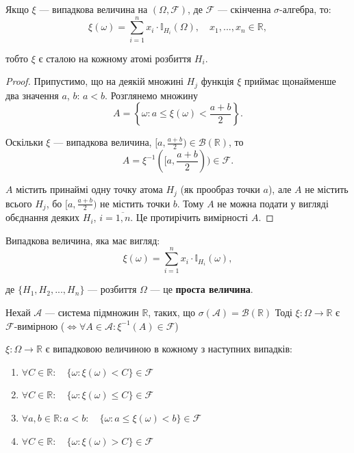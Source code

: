 \begin{theorem}
    Якщо $\xi$ --- випадкова величина на $(\Omega, \mathcal{F})$,
    де $\mathcal{F}$ --- скінченна $\sigma$-алгебра, то:
    $$\xi(\omega) = \sum\limits_{i=1}^{n} x_i \cdot \mathbb{I}_{H_i}(\Omega),
    \quad x_1, ..., x_n \in \mathbb{R},$$
    
    тобто $\xi$ є сталою на кожному атомі розбиття $H_i$.
\end{theorem}
\begin{proof}
    Припустимо, що на деякій множині $H_j$ функція $\xi$ приймає щонайменше два 
    значення $a$, $b$: $a < b$. 
    Розглянемо множину 
    $$A = \left\{\omega: a \leqslant \xi(\omega) < \frac{a+b}{2}\right\}.$$
    
    Оскільки $\xi$ --- випадкова величина, $[a, \frac{a+b}{2}) \in \mathcal{B}(\mathbb{R})$, то
    $$A = \xi^{-1}([a, \frac{a+b}{2})) \in \mathcal{F}.$$
    
    $A$ містить принаймі одну точку атома $H_j$ (як прообраз точки $a$), але $A$ не
    містить всього $H_j$, бо $[a, \frac{a+b}{2})$ не містить точки $b$.
    Тому $A$ не можна подати у вигляді обєднання деяких $H_i$, $i = \overline{1, n}$.
    Це протирічить вимірності $A$.
\end{proof}

\begin{definition}
    Випадкова величина, яка має вигляд:
    $$\xi(\omega) = \sum\limits_{i=1}^{n} x_i \cdot \mathbb{I}_{H_i}(\omega),$$

    де $\{H_1, H_2, ..., H_n\}$ --- розбиття $\Omega$ --- це \textbf{проста величина}.
\end{definition}

\begin{theorem}
    Нехай $\mathcal{A}$ --- система підмножин $\mathbb{R}$, таких, що
    $\sigma(\mathcal{A}) = \mathcal{B}(\mathbb{R})$
    Тоді $\xi: \Omega \rightarrow \mathbb{R}$ є $\mathcal{F}$-вимірною
    ($\Leftrightarrow \forall A \in \mathcal{A}: \xi^{-1}(A) \in \mathcal{F}$) 
\end{theorem}

\begin{corollary}
    $\xi: \Omega \rightarrow \mathbb{R}$ є випадковою величиною в
    кожному з наступних випадків:

    \begin{enumerate}
        \item $\forall C \in \mathbb{R}: \quad \{\omega: \xi(\omega) < C\} \in \mathcal{F}$
        \item $\forall C \in \mathbb{R}: \quad \{\omega: \xi(\omega) \leqslant C\} \in \mathcal{F}$
        \item $\forall a, b \in \mathbb{R}: a < b: \quad \{\omega: a \leqslant \xi(\omega) < b\} \in \mathcal{F}$
        \item $\forall C \in \mathbb{R}: \quad \{\omega: \xi(\omega) > C\} \in \mathcal{F}$
    \end{enumerate}
\end{corollary}

